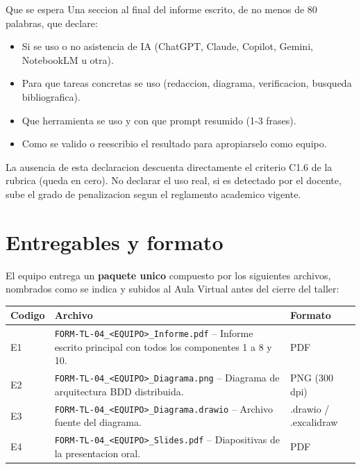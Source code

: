 \documentclass[11pt,a4paper]{article}
\newcommand{\codigo}[1]{\texttt{\textcolor{uteqBlue}{#1}}}
\begin{document}
\begin{cajadefinicion}{Que se espera}
Una seccion al final del informe escrito, de no menos de 80 palabras, que declare:
\begin{itemize}
\item Si se uso o no asistencia de IA (ChatGPT, Claude, Copilot, Gemini, NotebookLM u otra).
\item Para que tareas concretas se uso (redaccion, diagrama, verificacion, busqueda bibliografica).
\item Que herramienta se uso y con que prompt resumido (1-3 frases).
\item Como se valido o reescribio el resultado para apropiarselo como equipo.
\end{itemize}
\end{cajadefinicion}

La ausencia de esta declaracion descuenta directamente el criterio C1.6 de la rubrica (queda en cero). No declarar el uso real, si es detectado por el docente, sube el grado de penalizacion segun el reglamento academico vigente.

\newpage
\section{Entregables y formato}

El equipo entrega un \textbf{paquete unico} compuesto por los siguientes archivos, nombrados como se indica y subidos al Aula Virtual antes del cierre del taller:

\renewcommand{\arraystretch}{1.25}
\begin{xltabular}{\linewidth}{@{}lXl@{}}
\toprule
\textbf{Codigo} & \textbf{Archivo} & \textbf{Formato} \\
\midrule
E1 & \codigo{FORM-TL-04\_\textless EQUIPO\textgreater\_Informe.pdf} -- Informe escrito principal con todos los componentes 1 a 8 y 10. & PDF \\
E2 & \codigo{FORM-TL-04\_\textless EQUIPO\textgreater\_Diagrama.png} -- Diagrama de arquitectura BDD distribuida. & PNG (300 dpi) \\
E3 & \codigo{FORM-TL-04\_\textless EQUIPO\textgreater\_Diagrama.drawio} -- Archivo fuente del diagrama. & .drawio / .excalidraw \\
E4 & \codigo{FORM-TL-04\_\textless EQUIPO\textgreater\_Slides.pdf} -- Diapositivas de la presentacion oral. & PDF \\
\bottomrule
\end{xltabular}
\end{document}
